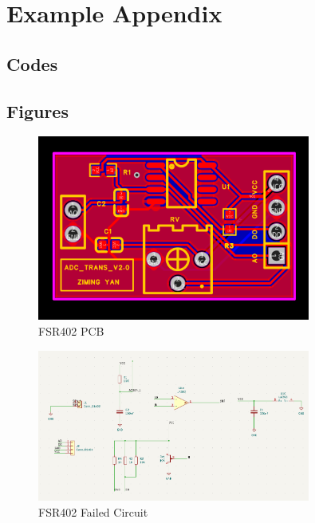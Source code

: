 \section{Example Appendix} \label{appendix:a}
\subsection{Codes}
\subsection{Figures}
\begin{figure}[h]
    \centering
    \includegraphics[width=0.8\textwidth]{Figures/FSR402_PCB.png}
    \caption{FSR402 PCB}
    \label{fig:fsr402_pcb}
\end{figure}
\begin{figure}[h]
    \centering
    \includegraphics[width=0.8\textwidth]{Figures/FSR402_Circuit_F.png}
    \caption{FSR402 Failed Circuit}
    \label{fig:fsr402_failed_circuit}
\end{figure}
